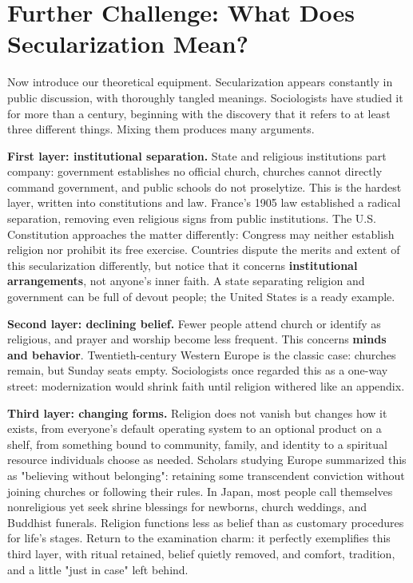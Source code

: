 \section[Further Challenge: Secularization]{Further Challenge: What Does Secularization Mean?}
Now introduce our theoretical equipment. Secularization appears constantly in public discussion, with thoroughly tangled meanings. Sociologists have studied it for more than a century, beginning with the discovery that it refers to at least three different things. Mixing them produces many arguments.

\textbf{First layer: institutional separation.} State and religious institutions part company: government establishes no official church, churches cannot directly command government, and public schools do not proselytize. This is the hardest layer, written into constitutions and law. France's 1905 law established a radical separation, removing even religious signs from public institutions. The U.S. Constitution approaches the matter differently: Congress may neither establish religion nor prohibit its free exercise. Countries dispute the merits and extent of this secularization differently, but notice that it concerns \textbf{institutional arrangements}, not anyone's inner faith. A state separating religion and government can be full of devout people; the United States is a ready example.

\textbf{Second layer: declining belief.} Fewer people attend church or identify as religious, and prayer and worship become less frequent. This concerns \textbf{minds and behavior}. Twentieth-century Western Europe is the classic case: churches remain, but Sunday seats empty. Sociologists once regarded this as a one-way street: modernization would shrink faith until religion withered like an appendix.

\textbf{Third layer: changing forms.} Religion does not vanish but changes how it exists, from everyone's default operating system to an optional product on a shelf, from something bound to community, family, and identity to a spiritual resource individuals choose as needed. Scholars studying Europe summarized this as "believing without belonging": retaining some transcendent conviction without joining churches or following their rules. In Japan, most people call themselves nonreligious yet seek shrine blessings for newborns, church weddings, and Buddhist funerals. Religion functions less as belief than as customary procedures for life's stages. Return to the examination charm: it perfectly exemplifies this third layer, with ritual retained, belief quietly removed, and comfort, tradition, and a little "just in case" left behind.


